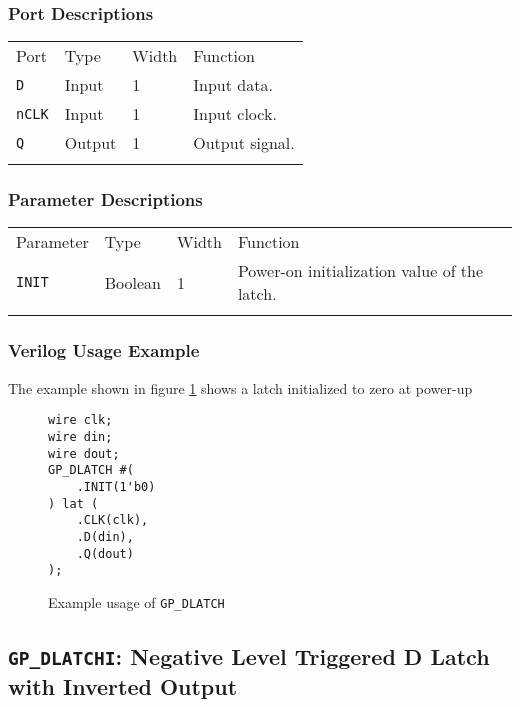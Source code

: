 \documentclass[11pt]{article}
\newcommand{\tokenstyle}[1]{\texttt{#1}}
\newcommand{\whenstyle}[1]{{\fontseries{sb}\selectfont#1}}
\newcommand{\thinhline}{\Xhline{1\arrayrulewidth}}
\newcommand{\thickhline}{\Xhline{2.5\arrayrulewidth}}
\begin{document}
\subsubsection{Port Descriptions}

\begin{tabularx}{\textwidth}{lllX}
\thinhline
\whenstyle{Port} & \whenstyle{Type} & \whenstyle{Width} & \whenstyle{Function} \\
\thickhline
\tokenstyle{D} & Input & 1 & Input data. \\
\thinhline
\tokenstyle{nCLK} & Input & 1 & Input clock. \\
\thinhline
\tokenstyle{Q} & Output & 1 & Output signal. \\
\thinhline
\end{tabularx}

\subsubsection{Parameter Descriptions}

\begin{tabularx}{\textwidth}{lllX}
\thinhline
\whenstyle{Parameter} & \whenstyle{Type} & \whenstyle{Width} & \whenstyle{Function} \\
\thickhline
\tokenstyle{INIT} & Boolean & 1 & Power-on initialization value of the latch.\\
\thinhline
\end{tabularx}

\subsubsection{Verilog Usage Example}

The example shown in figure \ref{gp-dlatch-example} shows a latch initialized to zero at power-up

\begin{figure}[h]
\begin{lstlisting}
wire clk;
wire din;
wire dout;
GP_DLATCH #(
	.INIT(1'b0)
) lat (
	.CLK(clk),
	.D(din),
	.Q(dout)
);
\end{lstlisting}
\caption{Example usage of \tokenstyle{GP\_DLATCH}}
\label{gp-dlatch-example}
\end{figure}


\pagebreak
\subsection{\tokenstyle{GP\_DLATCHI}: Negative Level Triggered D Latch with Inverted Output}
\label{gp-latchi}
\end{document}
